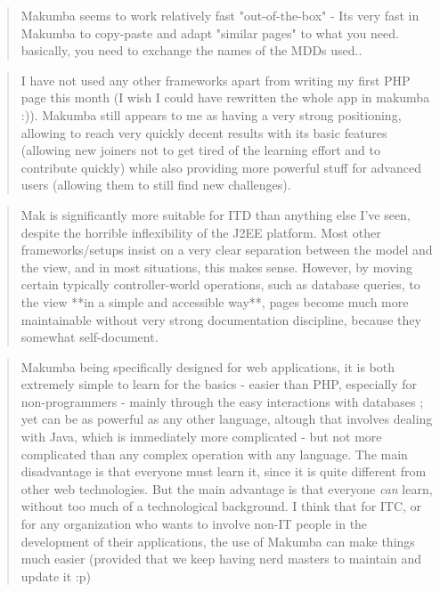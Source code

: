 \documentclass{acm_proc_article-sp}
\begin{document}
\begin{quotation}
	Makumba seems to work relatively fast "out-of-the-box" - Its very fast in Makumba to copy-paste and adapt "similar pages" to what you need. basically, you need to exchange the names of the MDDs used.. 
\end{quotation}

\begin{quotation}
	I have not used any other frameworks apart from writing my first PHP page this month (I wish I could have rewritten the whole app in makumba :)). Makumba still appears to me as having a very strong positioning, allowing to reach very quickly decent results with its basic features (allowing new joiners not to get tired of the learning effort and to contribute quickly) while also providing more powerful stuff for advanced users (allowing them to still find new challenges). 
\end{quotation}

\begin{quotation}
	Mak is significantly more suitable for ITD than anything else I've seen, despite the horrible inflexibility of the J2EE platform. Most other frameworks/setups insist on a very clear separation between the model and the view, and in most situations, this makes sense. However, by moving certain typically controller-world operations, such as database queries, to the view **in a simple and accessible way**, pages become much more maintainable without very strong documentation discipline, because they somewhat self-document.
\end{quotation}

\begin{quotation}
	Makumba being specifically designed for web applications, it is both extremely simple to learn for the basics - easier than PHP, especially for non-programmers - mainly through the easy interactions with databases ; yet can be as powerful as any other language, altough that involves dealing with Java, which is immediately more complicated - but not more complicated than any complex operation with any language.
	The main disadvantage is that everyone must learn it, since it is quite different from other web technologies. But the main advantage is that everyone \textit{can} learn, without too much of a technological background. I think that for ITC, or for any organization who wants to involve non-IT people in the development of their applications, the use of Makumba can make things much easier (provided that we keep having nerd masters to maintain and update it :p) 
\end{quotation}
\end{document}
